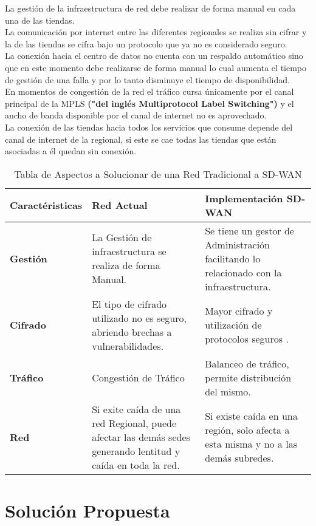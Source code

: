 La gestión de la infraestructura de red debe realizar de forma manual en cada una de las tiendas.
\\
	La comunicación por internet entre las diferentes regionales se realiza sin cifrar y la de las tiendas se cifra bajo un protocolo que ya no es considerado seguro.
\\
	La conexión hacia el centro de datos no cuenta con un respaldo automático sino que en este momento debe realizarse de forma manual lo cual aumenta el tiempo de gestión de una falla y por lo tanto disminuye el tiempo de disponibilidad.
\\
	En momentos de congestión de la red el tráfico cursa únicamente por el canal principal de la MPLS \textbf{("del inglés Multiprotocol Label Switching")} y el ancho de banda disponible por el canal de internet no es aprovechado.
\\
La conexión de las tiendas hacia todos los servicios que consume depende del canal de internet de la regional, si este se cae todas las tiendas que están asociadas a él quedan sin conexión.


\begin{table}[ht]
\caption{Tabla de Aspectos a Solucionar de una Red Tradicional a SD-WAN}
\label{tabla:autores}
\centering
\begin{tabular}{p{3.5cm} p{5.5cm} p{5.5cm} }
\hline
\textbf{Caractéristicas} & \textbf{Red Actual} & \textbf{Implementación SD-WAN} \\
\hline
\textbf{Gestión} &  La Gestión de infraestructura se realiza de forma Manual.  & Se tiene un gestor de Administración facilitando lo relacionado con la infraestructura.\\
\hline
\textbf{Cifrado} & El tipo de cifrado utilizado no es seguro, abriendo brechas a vulnerabilidades. & Mayor cifrado y utilización de protocolos seguros . \\
\hline
\textbf{Tráfico} & Congestión de Tráfico & Balanceo de tráfico, permite distribución del mismo. \\
\hline
\textbf{Red} & Si exite caída de una red Regional, puede afectar las demás sedes generando lentitud y caída en toda la red. & Si existe caída en una región, solo afecta a esta misma y no a las demás subredes. \\
\hline

\end{tabular}
\end{table}


\section{Solución Propuesta} %
\label{sec:Solución Propuesta}

